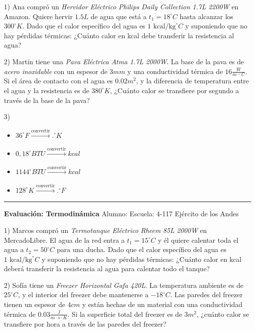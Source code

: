 \documentclass[a4paper,10pt]{article}
\begin{document}
1) Ana compró un \emph{Hervidor Eléctrico Philips Daily Collection 1.7L 2200W} en Amazon. Quiere hervir $1.5L$ de agua que está a $t_1 = 18^\circ C$ hasta alcanzar los $300^\circ K$. Dado que el calor específico del agua es $1 \text{ kcal/kg}^\circ C$ y suponiendo que no hay pérdidas térmicas:   ¿Cuánto calor en kcal debe transferir la resistencia al agua?



\vspace{0.5cm}
  

2) Martín tiene una \emph{Pava Eléctrica Atma 1.7L 2000W}. La base de la pava es de \emph{acero inoxidable} con un espesor de $3mm$ y una conductividad térmica de $16 \frac{W}{m \cdot ^\circ C}$.  
Si el área de contacto con el agua es $0.02m^2$, y la diferencia de temperatura entre el agua y la resistencia es de $380^\circ K$, ¿Cuánto calor se transfiere por segundo a través de la base de la pava?

3)
\begin{itemize}
  
\item $36^\circ F \xrightarrow{\text{convertir}}  .^\circ K $

\item $0,18^\circ BTU \xrightarrow{\text{convertir}} kcal $

\item $1144^\circ BTU \xrightarrow{\text{convertir}}  kcal $

   \item $128^\circ K \xrightarrow{\text{convertir}}  .^\circ F $

\end{itemize}

\rule{\textwidth}{1pt} 
\centerline{\textbf{Evaluación: Termodinámica} \quad Alumno: \underline{\hspace{4cm}} \quad Escuela: 4-117 Ejército de los Andes}

1) Marcos compró un \emph{Termotanque Eléctrico Rheem 85L 2000W} en MercadoLibre.  
El agua de la red entra a $t_1 = 15^\circ C$ y él quiere calentar toda el agua a $t_2 = 50^\circ C$ para una ducha.  
Dado que el calor específico del agua es $1 \text{ kcal/kg}^\circ C$ y suponiendo que no hay pérdidas térmicas:  
¿Cuánto calor en kcal deberá transferir la resistencia al agua para calentar todo el tanque?  

\vspace{0.5cm}

2) Sofía tiene un \emph{Freezer Horizontal Gafa 420L}. La temperatura ambiente es de $25^\circ C$, y el interior del freezer debe mantenerse a $-18^\circ C$.  
Las paredes del freezer tienen un espesor de $4cm$ y están hechas de un material con una conductividad térmica de $0.03 \frac{ J}{m \cdot s \cdot K}$.  
Si la superficie total del freezer es de $3 m^2$, ¿cuánto calor se transfiere por hora a través de las paredes del freezer?  
\end{document}
